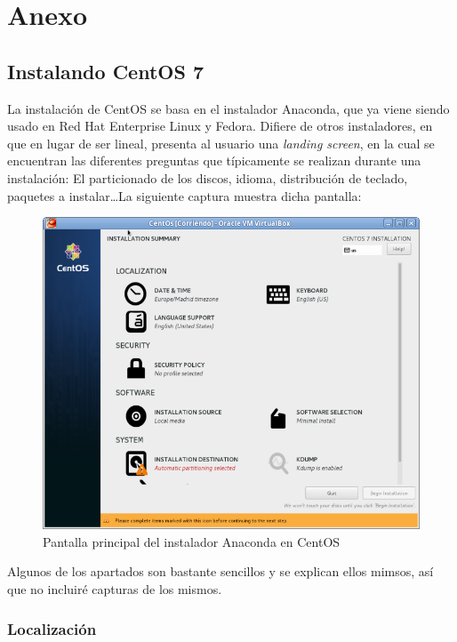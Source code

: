 \chapter{Anexo}
\label{ch:anexo}

\section{Instalando CentOS 7}
\label{sec:instalando_centos}

La instalación de CentOS se basa en el instalador Anaconda, que ya viene siendo usado en Red Hat Enterprise Linux y Fedora. Difiere de otros instaladores, en que en lugar de ser lineal, presenta al usuario una \emph{landing screen}, en la cual se encuentran las diferentes preguntas que típicamente se realizan durante una instalación: El particionado de los discos, idioma, distribución de teclado, paquetes a instalar\ldots La siguiente captura muestra dicha pantalla:

\begin{figure}[ht!]
  \centering
  \includegraphics[scale=0.55]{img/anaconda1.png}
  \caption{\label{fig:label} Pantalla principal del instalador Anaconda en CentOS}
\end{figure}

Algunos de los apartados son bastante sencillos y se explican ellos mimsos, así que no incluiré capturas de los mismos. 

\subsection{Localización}
\label{subsec:localizacion}

